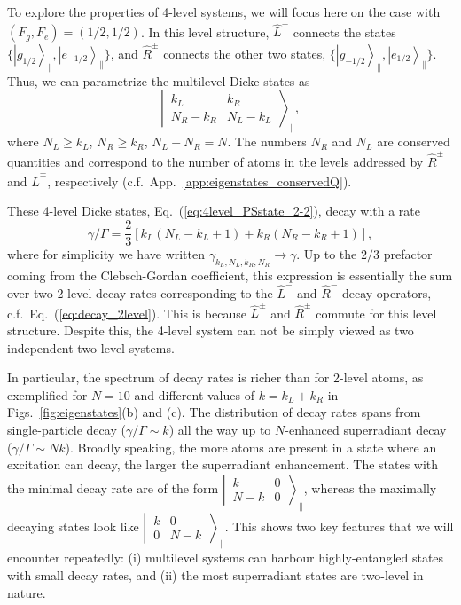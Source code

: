 \documentclass[aps,prx,superscriptaddress,twocolumn,notitlepage,nofootinbib,longbibliography]{revtex4-2}
\newcommand{\ket}[1]{\left|#1\right>}
\begin{document}
To explore the properties of 4-level systems, we will focus here on the case with $(F_g,F_e)=(1/2,1/2)$.
In this level structure, $\hat{L}^\pm$ connects the states $\{ \ket{g_{1/2}}_\parallel, \ket{e_{-1/2}}_\parallel \}$, and $\hat{R}^\pm$ connects the other two states, $\{ \ket{g_{-1/2}}_\parallel, \ket{e_{1/2}}_\parallel \}$.
Thus, we can parametrize the multilevel Dicke states as
\begin{equation}
	\left|\, \begin{matrix} k_L & k_R \\ N_R-k_R & N_L-k_L \end{matrix} \,\right\rangle_\parallel ,
\label{eq:4level_PSstate_2-2}
\end{equation}
where $N_L\geq k_L$, $N_R\geq k_R$, $N_L+N_R = N$.
The numbers $N_R$ and $N_L$ are conserved quantities and correspond to the number of atoms in the levels addressed by $\hat{R}^\pm$ and $\hat{L}^\pm$, respectively (c.f.~App.~\ref{app:eigenstates_conservedQ}).

These 4-level Dicke states, Eq.~(\ref{eq:4level_PSstate_2-2}), decay with a rate
\begin{equation}
	\gamma/\Gamma = \frac{2}{3}\left[ k_L(N_L-k_L+1) + k_R(N_R-k_R+1) \right] ,
\end{equation}
where for simplicity we have  written $\gamma_{k_L,N_L,k_R,N_R} \rightarrow \gamma$. Up to the $2/3$ prefactor coming from the Clebsch-Gordan coefficient, this expression is essentially the sum over two 2-level decay rates corresponding to the $\hat{L}^-$ and $\hat{R}^-$ decay operators, c.f.~Eq.~(\ref{eq:decay_2level}). This is because $\hat{L}^\pm$ and $\hat{R}^\pm$ commute for this level structure. Despite this, the 4-level system can not be simply viewed as two independent two-level systems.

In particular, the spectrum of decay rates is richer than for 2-level atoms, as exemplified for $N=10$ and different values of $k=k_L+k_R$ in Figs.~\ref{fig:eigenstates}(b) and (c).
The distribution of decay rates spans from single-particle decay ($\gamma/\Gamma\sim k$) all the way up to $N$-enhanced superradiant decay ($\gamma/\Gamma\sim Nk$).
Broadly speaking, the more atoms are present in a state where an excitation can decay, the larger the superradiant enhancement.
The states with the minimal decay rate are of the form $\left|\, \begin{smallmatrix} k & 0 \\ N-k & 0 \end{smallmatrix} \,\right\rangle_\parallel $, whereas the maximally decaying states look like $\left|\, \begin{smallmatrix} k & 0 \\ 0 & N-k \end{smallmatrix} \,\right\rangle_\parallel $.
This shows two key features that we will encounter repeatedly: (i) multilevel systems can harbour highly-entangled states with small decay rates, and (ii) the most superradiant states are two-level in nature.
\end{document}
